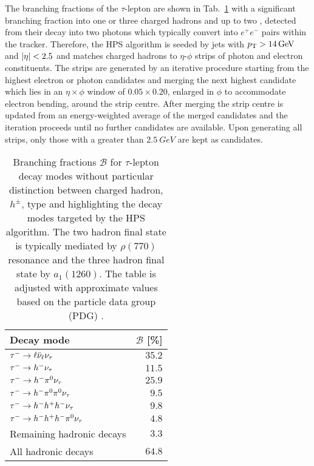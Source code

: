 The branching fractions of the $\tau$-lepton are shown in Tab.~\ref{tab:tau-decays} with a significant \Ptauh branching fraction into one or three charged hadrons and up to two \Ppizero, detected from their decay into two photons which typically convert into $e^+e^-$ pairs within the tracker. Therefore, the HPS algorithm is seeded by jets with ${p_{\text{T}}>\SI{14}{GeV}}$ and ${|\eta|<2.5}$ and matches charged hadrons to $\eta$-$\phi$ strips of photon and electron constituents. The strips are generated by an iterative procedure starting from the highest \pt electron or photon candidates and merging the next highest \pt candidate which lies in an $\eta\times\phi$ window of $0.05\times 0.20$, enlarged in $\phi$ to accommodate electron bending, around the strip centre. After merging the strip centre is updated from an energy-weighted average of the merged candidates and the iteration proceeds until no further candidates are available. Upon generating all strips, only those with a \pt greater than $\SI{2.5}{GeV}$ are kept as \Ppizero candidates.

\begin{table}[htb]
    \centering
    \begin{tabular}{lr}
        \hline\hline
        Decay mode & $\mathcal{B}$ [\%] \\
        \hline
        $\tau^-\rightarrow\ell\bar{\nu}_{\ell}\nu_{\tau}$ & $35.2$ \\
        \hline
        $\tau^-\rightarrow h^-\nu_{\tau}$ & $11.5$ \\
        $\tau^-\rightarrow h^-\pi^{0}\nu_{\tau}$ & $25.9$ \\
        $\tau^-\rightarrow h^-\pi^{0}\pi^{0}\nu_{\tau}$ & $9.5$ \\
        $\tau^-\rightarrow h^-h^+h^-\nu_{\tau}$ & $9.8$ \\
        $\tau^-\rightarrow h^-h^+h^-\pi^{0}\nu_{\tau}$ & $4.8$ \\
        Remaining hadronic decays & $3.3$ \\
        \hline
        All hadronic decays & $64.8$ \\
        \hline\hline
    \end{tabular}
    \caption[Branching fractions of the $\tau$-lepton decay modes.]{
        Branching fractions $\mathcal{B}$ for $\tau$-lepton decay modes
        without particular distinction between charged hadron, $h^{\pm}$, type
        and highlighting the decay modes targeted by the HPS algorithm. The
        two hadron final state is typically mediated by $\rho(770)$ resonance
        and the three hadron final state by $a_1(1260)$. The table is adjusted
        \cite{Khachatryan:2062435} with approximate values based on the
        particle data group (PDG) \cite{PhysRevD.98.030001}.
    }
    \label{tab:tau-decays}
\end{table}

